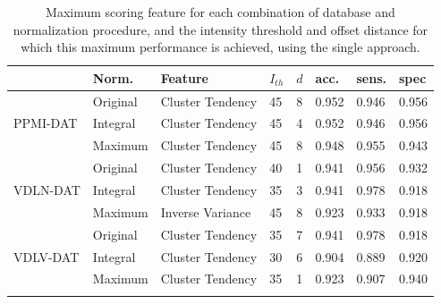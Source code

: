 \begin{table}[htp]
	\centering
\begin{tabular}{llllllll}
	\toprule
	                          & Norm.    & Feature         & $I_{th}$ & $d$ & acc.  & sens. & spec  \\ \midrule
	\multirow{3}{*}{PPMI-DAT} & Original & Cluster Tendency & 45       & 8            & 0.952 & 0.946 & 0.956 \\
	                          & Integral & Cluster Tendency & 45       & 4            & 0.952 & 0.946 & 0.956 \\
	                          & Maximum  & Cluster Tendency & 45       & 8            & 0.948 & 0.955 & 0.943 \\\midrule
	\multirow{3}{*}{VDLN-DAT} & Original & Cluster Tendency & 40       & 1              & 0.941 & 0.956 & 0.932 \\
	                          & Integral & Cluster Tendency & 35       & 3            & 0.941 & 0.978 & 0.918 \\
	                          & Maximum  & Inverse Variance & 45       & 8            & 0.923 & 0.933 & 0.918 \\\midrule
	\multirow{3}{*}{VDLV-DAT} & Original & Cluster Tendency & 35       & 7            & 0.941 & 0.978 & 0.918 \\
	                          & Integral & Cluster Tendency & 30       & 6            & 0.904 & 0.889 & 0.920 \\
	                          & Maximum  & Cluster Tendency & 35       & 1              & 0.923 & 0.907 & 0.940 \\ 
	                          \bottomrule& 
\end{tabular}
	\caption[Maximum scoring feature (single approach).]{Maximum scoring feature for each combination of database and normalization procedure, and the intensity threshold and offset distance for which this maximum performance is achieved, using the single approach.}
	\label{tab:exp1AccSingle}
\end{table}

